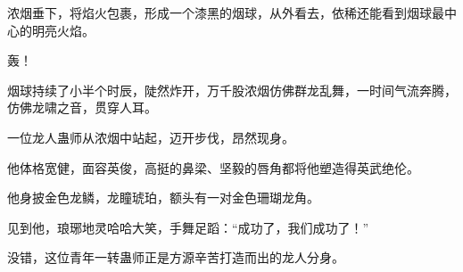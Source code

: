 \begin{this_body}
浓烟垂下，将焰火包裹，形成一个漆黑的烟球，从外看去，依稀还能看到烟球最中心的明亮火焰。

轰！

烟球持续了小半个时辰，陡然炸开，万千股浓烟仿佛群龙乱舞，一时间气流奔腾，仿佛龙啸之音，贯穿人耳。

一位龙人蛊师从浓烟中站起，迈开步伐，昂然现身。

他体格宽健，面容英俊，高挺的鼻梁、坚毅的唇角都将他塑造得英武绝伦。

他身披金色龙鳞，龙瞳琥珀，额头有一对金色珊瑚龙角。

见到他，琅琊地灵哈哈大笑，手舞足蹈：“成功了，我们成功了！”

没错，这位青年一转蛊师正是方源辛苦打造而出的龙人分身。

\end{this_body}

